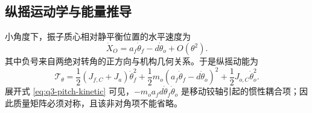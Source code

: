 \documentclass[withoutpreface]{../../../templates/CUMCM2026-Complete-LaTeX/cumcmthesis}
\begin{document}
\subsection{纵摇运动学与能量推导}

小角度下，振子质心相对静平衡位置的水平速度为
\begin{equation}
  \dot X_O=a_f\dot\theta_f-d\dot\theta_o+O(\theta^2).
  \label{eq:q3-horizontal-velocity}
\end{equation}
其中负号来自两绝对转角的正方向与机构几何关系。于是纵摇动能为
\begin{equation}
  \mathcal T_\theta=
  \frac12(J_{f,C}+J_a)\dot\theta_f^2
  +\frac12m_o(a_f\dot\theta_f-d\dot\theta_o)^2
  +\frac12J_{o,C}\dot\theta_o^2.
  \label{eq:q3-pitch-kinetic}
\end{equation}
展开式 \eqref{eq:q3-pitch-kinetic} 可见，$-m_oa_fd\dot\theta_f\dot\theta_o$ 是移动铰轴引起的惯性耦合项；因此质量矩阵必须对称，且该非对角项不能省略。
\end{document}
